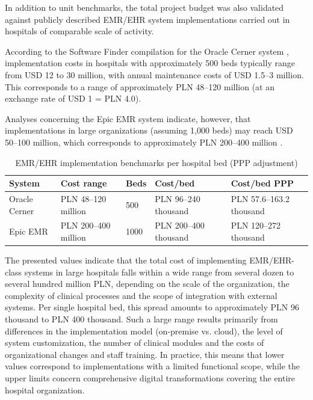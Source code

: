 In addition to unit benchmarks, the total project budget was also validated against publicly described EMR/EHR system implementations carried out in hospitals of comparable scale of activity.

According to the Software Finder compilation for the Oracle Cerner system \cite{SoftwareFinder_Cerner_2026}, implementation costs in hospitals with approximately 500 beds typically range from USD 12 to 30 million, with annual maintenance costs of USD 1.5--3 million. This corresponds to a range of approximately PLN 48--120 million (at an exchange rate of USD 1 = PLN 4.0).

Analyses concerning the Epic EMR system indicate, however, that implementations in large organizations (assuming 1,000 beds) may reach USD 50--100 million, which corresponds to approximately PLN 200--400 million \cite{ThePricer_Epic_2024}.

\begin{table}[h]
\centering
\small
\renewcommand{\arraystretch}{1.2}
\setlength{\tabcolsep}{4pt}

\begin{tabular}{|p{2.8cm}|p{2.6cm}|p{1.6cm}|p{2.2cm}|p{2.6cm}|}
\hline
\rowcolor{gray!20}
\textbf{System} & \textbf{Cost range} & \textbf{Beds} & \textbf{Cost/bed} & \textbf{Cost/bed PPP} \\
\hline

Oracle Cerner &
PLN 48--120 million &
500 &
PLN 96--240 thousand &
PLN 57.6--163.2 thousand \\
\hline

Epic EMR &
PLN 200--400 million &
1000 &
PLN 200--400 thousand &
PLN 120--272 thousand \\
\hline

\end{tabular}

\caption{EMR/EHR implementation benchmarks per hospital bed (PPP adjustment)}
\label{tab:per_bed_benchmark}
\end{table}

The presented values indicate that the total cost of implementing EMR/EHR-class systems in large hospitals falls within a wide range from several dozen to several hundred million PLN, depending on the scale of the organization, the complexity of clinical processes and the scope of integration with external systems. Per single hospital bed, this spread amounts to approximately PLN 96 thousand to PLN 400 thousand. Such a large range results primarily from differences in the implementation model (on-premise vs. cloud), the level of system customization, the number of clinical modules and the costs of organizational changes and staff training. In practice, this means that lower values correspond to implementations with a limited functional scope, while the upper limits concern comprehensive digital transformations covering the entire hospital organization.

